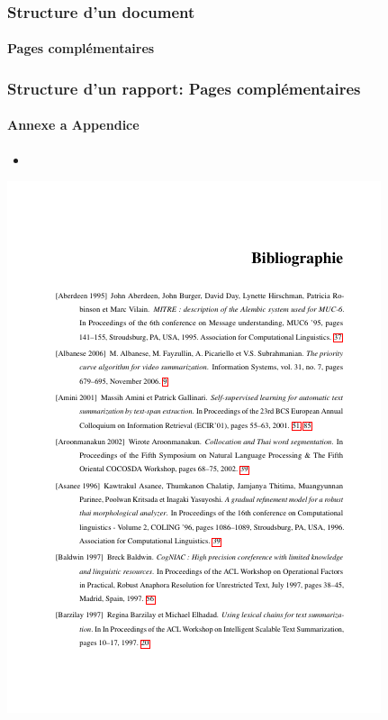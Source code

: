 \documentclass[xcolor=table]{beamer}
\begin{document}
\begin{frame}
\frametitle{Structure d'un document}
\framesubtitle{Pages complémentaires}



\end{frame}

\begin{frame}
\frametitle{Structure d'un rapport: Pages complémentaires}
\framesubtitle{Annexe a Appendice}

\begin{minipage}{0.52\textwidth}
	\begin{itemize}
		\item 
	\end{itemize}
\end{minipage}
\begin{minipage}{0.42\textwidth}
	\includegraphics[width=\textwidth]{..//img/Bweb03-redaction/bibliographie.png}
\end{minipage}

\end{frame}
\end{document}
